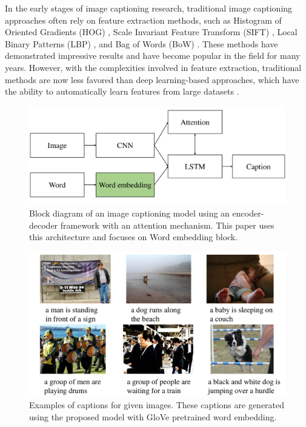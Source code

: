 \documentclass[conference]{IEEEtran}
\begin{document}
In the early stages of image captioning research, traditional image captioning approaches often rely on feature extraction methods, such as Histogram of Oriented Gradients (HOG) \cite{tomasi2012histograms}, Scale Invariant Feature Transform (SIFT) \cite{david2004distinctive}, Local Binary Patterns (LBP) \cite{ojala2000gray}, and Bag of Words (BoW) \cite{tsai2012bag}. These methods have demonstrated impressive results and have become popular in the field for many years. However, with the complexities involved in feature extraction, traditional methods are now less favored than deep learning-based approaches, which have the ability to automatically learn features from large datasets \cite{pouyanfar2018survey}.

\begin{figure}[t]
\centering
\includegraphics[width=0.95\columnwidth]{assets/abstract-architecture.pdf}
  \caption{Block diagram of an image captioning model using an encoder-decoder framework with an attention mechanism. This paper uses this architecture and focuses on Word embedding block.}
  \label{fig:example}
\end{figure}

\begin{figure}[t]
\includegraphics[width=\columnwidth]{assets/example_image_captioning.pdf}
\caption{Examples of captions for given images. These captions are generated using the proposed model with GloVe pretrained word embedding.}
  \label{fig:example}
\end{figure}
\end{document}

